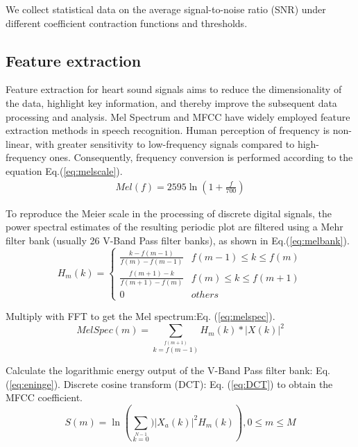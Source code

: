 We collect statistical data on the average signal-to-noise ratio (SNR) under different coefficient contraction functions and thresholds.
\subsection{Feature extraction}
Feature extraction for heart sound signals aims to reduce the dimensionality of the data, highlight key information, and thereby improve the subsequent data processing and analysis. Mel Spectrum and MFCC have widely employed feature extraction methods in speech recognition. Human perception of frequency is non-linear, with greater sensitivity to low-frequency signals compared to high-frequency ones. Consequently, frequency conversion is performed according to the equation Eq.(\ref{eq:melscale}).
\begin{equation}
	\begin{aligned}
Mel(f)=2595\ln \left(1+\frac{f}{700} \right)
\label{eq:melscale}
	\end{aligned}
\end{equation}

To reproduce the Meier scale in the processing of discrete digital signals, the power spectral estimates of the resulting periodic plot are filtered using a Mehr filter bank (usually 26 V-Band Pass filter banks), as shown in Eq.(\ref{eq:melbank}).
\begin{equation}
H_m(k)=
	\begin{cases}
	\frac{k-f(m-1)}{f(m)-f(m-1)} & f(m-1)\leq k \leq f(m)\\
	\frac{f(m+1)-k}{f(m+1)-f(m)} & f(m)\leq k \leq f(m+1)\\
	{0} & others
	\end{cases}
	\label{eq:melbank}
\end{equation}

Multiply with FFT to get the Mel spectrum:Eq. (\ref{eq:melspec}).
\begin{equation}
MelSpec(m)=\sum\limits_{k=f(m-1)}\limits^{f(m+1)}H_m(k)*\left|X(k)\right|^2
	\label{eq:melspec}
\end{equation}

Calculate the logarithmic energy output of the V-Band Pass filter bank: Eq.(\ref{eq:eninge}). Discrete cosine transform (DCT): Eq. (\ref{eq:DCT}) to obtain the MFCC coefficient.
\begin{equation}
S(m)=\ln \left( {\sum\limits_{k=0}\limits^{N-1})\left|X_a(k)\right|^2H_m(k)}\right),
0 \leq m \leq M
	\label{eq:eninge}
\end{equation}

